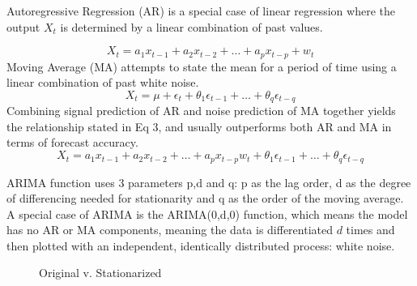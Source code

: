 \documentclass{article}[12pt]
\begin{document}
        Autoregressive Regression (AR) is a special case of linear regression where the output $X_t$ is determined by a linear combination of past values.

        \begin{equation}
            X_t = a_1 x_{t-1} +a_2 x_{t-2} + \dots +a_p x_{t-p} +w_t 
        \end{equation}
        Moving Average (MA) attempts to state the mean for a period of time using a linear combination of past white noise. 
        \begin{equation}
            X_t = \mu + \epsilon_t + \theta_1 \epsilon_{t-1} + \dots + \theta_q \epsilon_{t-q}
        \end{equation}
        Combining signal prediction of AR and noise prediction of MA together yields the relationship stated in Eq 3, and usually outperforms both AR and MA in terms of forecast accuracy. 
        \begin{equation}
            X_t = a_1 x_{t-1} +a_2 x_{t-2} + \dots +a_p x_{t-p}w_t +  \theta_1 \epsilon_{t-1} + \dots + \theta_q \epsilon_{t-q}
        \end{equation}

		ARIMA function uses 3 parameters p,d and q: p as the lag order, d as the degree of differencing needed for stationarity and q as the order of the moving average. A special case of ARIMA is the ARIMA(0,d,0) function, which means the model has no AR or MA components, meaning the data is differentiated $d$ times and then plotted with an independent, identically distributed process: white noise.
        \begin{figure}[!h]
            \centering
            \caption{Original v. Stationarized}
        \end{figure}
        
\end{document}
